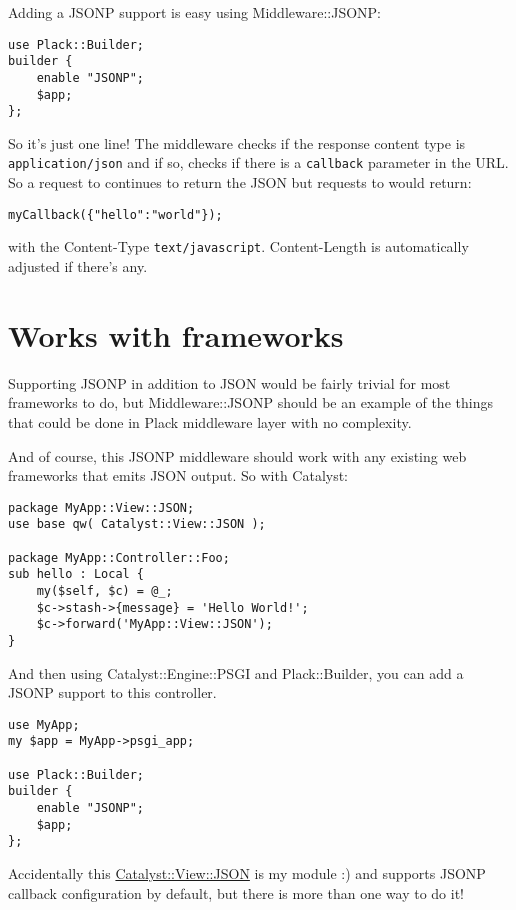 Adding a JSONP support is easy using Middleware::JSONP:

\begin{lstlisting}
use Plack::Builder;
builder {
    enable "JSONP";
    $app;
};
\end{lstlisting}

So it's just one line! The middleware checks if the response content
type is \lstinline!application/json! and if so, checks if there is a
\lstinline!callback! parameter in the URL. So a request to
 continues to return the JSON but requests to
 would return:

\begin{lstlisting}
myCallback({"hello":"world"});
\end{lstlisting}

with the Content-Type \lstinline!text/javascript!. Content-Length is
automatically adjusted if there's any.

\section{Works with frameworks}\label{works-with-frameworks}

Supporting JSONP in addition to JSON would be fairly trivial for most
frameworks to do, but Middleware::JSONP should be an example of the
things that could be done in Plack middleware layer with no complexity.

And of course, this JSONP middleware should work with any existing web
frameworks that emits JSON output. So with Catalyst:

\begin{lstlisting}
package MyApp::View::JSON;
use base qw( Catalyst::View::JSON );

package MyApp::Controller::Foo;
sub hello : Local {
    my($self, $c) = @_;
    $c->stash->{message} = 'Hello World!';
    $c->forward('MyApp::View::JSON');
}
\end{lstlisting}

And then using Catalyst::Engine::PSGI and Plack::Builder, you can add a
JSONP support to this controller.

\begin{lstlisting}
use MyApp;
my $app = MyApp->psgi_app;

use Plack::Builder;
builder {
    enable "JSONP";
    $app;
};
\end{lstlisting}

Accidentally this
\href{http://search.cpan.org/perldoc?Catalyst::View::JSON}{Catalyst::View::JSON}
is my module :) and supports JSONP callback configuration by default,
but there is more than one way to do it!


